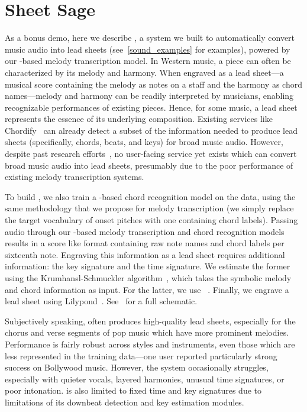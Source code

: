 \vspace{-2mm}
\section{Sheet Sage}
\label{sec:sheetsage}

As a bonus demo, 
here we describe \sheetsage, a system we built to automatically convert music audio into lead sheets (see~\cref{sound_examples} for examples), powered by our \jukebox-based melody transcription model. 
In Western music, a piece can often be characterized by its melody and harmony. 
When engraved as a lead sheet---a musical score containing the melody as notes on a staff and the harmony as chord names---melody and harmony can be readily interpreted by musicians, enabling recognizable performances of existing pieces. 
Hence, for some music, a lead sheet represents the essence of its underlying composition.
Existing services like Chordify~\cite{de2014chordify} can already detect a subset of the information needed to produce lead sheets (specifically, chords, beats, and keys) for broad music audio. 
However, despite past research efforts~\cite{ryynanen2008automatic,weil2009automatic}, no user-facing service yet exists which can convert broad music audio into lead sheets, presumably due to the poor performance of existing melody transcription systems.

To build \sheetsage, we also train a \jukebox-based chord recognition model on the \hooktheory{} data, using the same methodology that we propose for melody transcription (we simply replace the target vocabulary of onset pitches with one containing chord labels).
Passing audio through our \jukebox{}-based melody transcription and chord recognition models results in a score like format containing raw note names and chord labels per sixteenth note. 
Engraving this information as a lead sheet requires additional information: the key signature and the time signature. 
We estimate the former using the Krumhansl-Schmuckler algorithm~\cite{krumhansl1990cognitive,temperley1999key}, which takes the symbolic melody and chord information as input. 
For the latter, we use \madmom~\cite{bock2016madmom,bock2016joint}. 
Finally, we engrave a lead sheet using Lilypond~\cite{nienhuys2003lilypond}. 
See~ for a full schematic.

Subjectively speaking, \sheetsage{} often produces high-quality lead sheets, especially for the chorus and verse segments of pop music which have more prominent melodies. 
Performance is fairly robust across styles and instruments, even those which are less represented in the training data---one user reported particularly strong success on Bollywood music. 
However, the system occasionally struggles, especially with quieter vocals, layered harmonies, unusual time signatures, or poor intonation. 
\sheetsage{} is also limited to fixed time and key signatures due to limitations of its downbeat detection and key estimation modules.